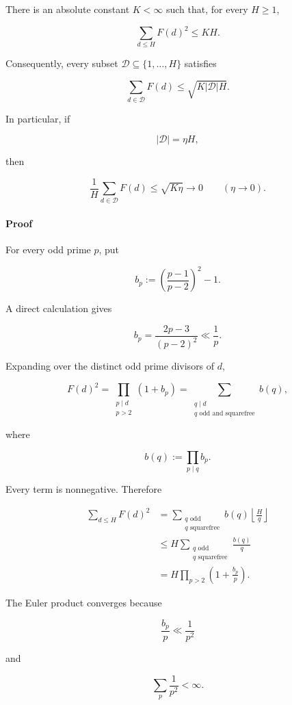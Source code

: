 There is an absolute constant \(K<\infty\) such that, for every \(H\ge1\),

\[
\boxed{
\sum_{d\le H}F(d)^2\le KH.
}
\tag{2}
\]

Consequently, every subset \(\mathcal D\subseteq\{1,\ldots,H\}\) satisfies

\[
\boxed{
\sum_{d\in\mathcal D}F(d)
\le
\sqrt{K|\mathcal D|H}.
}
\tag{3}
\]

In particular, if

\[
|\mathcal D|=\eta H,
\]

then

\[
\frac1H\sum_{d\in\mathcal D}F(d)
\le\sqrt{K\eta}\longrightarrow0
\qquad(\eta\to0).
\tag{4}
\]

\paragraph{Proof}

For every odd prime \(p\), put

\[
b_p:=
\left(\frac{p-1}{p-2}\right)^2-1.
\]

A direct calculation gives

\[
b_p
=
\frac{2p-3}{(p-2)^2}
\ll\frac1p.
\tag{5}
\]

Expanding over the distinct odd prime divisors of \(d\),

\[
F(d)^2
=
\prod_{\substack{p\mid d\\p>2}}(1+b_p)
=
\sum_{\substack{q\mid d\\q\text{ odd and squarefree}}}b(q),
\tag{6}
\]

where

\[
b(q):=\prod_{p\mid q}b_p.
\]

Every term is nonnegative. Therefore

\[
\begin{aligned}
\sum_{d\le H}F(d)^2
&=
\sum_{\substack{q\text{ odd}\\q\text{ squarefree}}}
b(q)\left\lfloor\frac Hq\right\rfloor\\
&\le
H\sum_{\substack{q\text{ odd}\\q\text{ squarefree}}}
\frac{b(q)}q\\
&=
H\prod_{p>2}\left(1+\frac{b_p}{p}\right).
\end{aligned}
\tag{7}
\]

The Euler product converges because

\[
\frac{b_p}{p}\ll\frac1{p^2}
\]

and

\[
\sum_p\frac1{p^2}<\infty.
\]

